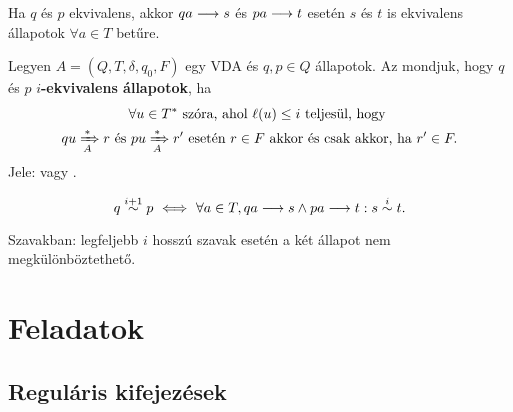 \begin{tcolorbox}
	\begin{proposition}
		Ha $q$ és $p$ ekvivalens, akkor $qa \longrightarrow s$ és $pa \longrightarrow t$
		esetén $s$ és $t$ is ekvivalens állapotok $\forall a \in T$ betűre.
	\end{proposition}
\end{tcolorbox}

\begin{tcolorbox}
	\begin{definition}
		Legyen $A = (Q, T, \delta,q_0, F)$ egy VDA és $q, p \in Q$ állapotok.
		Az mondjuk, hogy $q$ és $p$ \textbf{$i$-ekvivalens állapotok}, ha 
		\begin{gather*}
			\forall u \in T^* \text{ szóra, ahol } \ell(u) \leq i \text{ teljesül, hogy  } \\
			qu \xRightarrow[{A}]{*} r \text{ és } pu \xRightarrow[{A}]{*} r' \text{ esetén } r \in F\text{ akkor és csak akkor, ha } r' \in F.
		\end{gather*}
		Jele:  vagy  .
	\end{definition}
\end{tcolorbox}

\begin{tcolorbox}
	\begin{lemma}
		\[ q \stackrel{i+1}{\sim} p ~ \Longleftrightarrow ~ \forall a \in T , qa \longrightarrow s \land pa \longrightarrow t : s \stackrel{i}{\sim} t. \]
	\end{lemma}
\end{tcolorbox}

Szavakban: legfeljebb $i$ hosszú szavak esetén a két állapot nem megkülönböztethető.

\iffalse

\section{Feladatok}

\subsection{Reguláris kifejezések}

